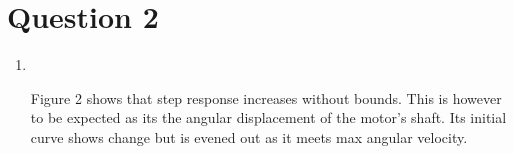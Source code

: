 \documentclass[a4paper,11pt]{article}
\begin{document}
\section*{Question 2}
\begin{enumerate}[label=\alph*)]
        \item  
        \begin{figure}[h]
                \centering
                \caption{}
                \end{figure} 

        Figure 2 shows that step response increases without bounds. This is however to be expected as its the angular displacement of the motor's shaft. Its initial curve shows change but is evened out as it meets max angular velocity.


\end{enumerate}
\end{document}
